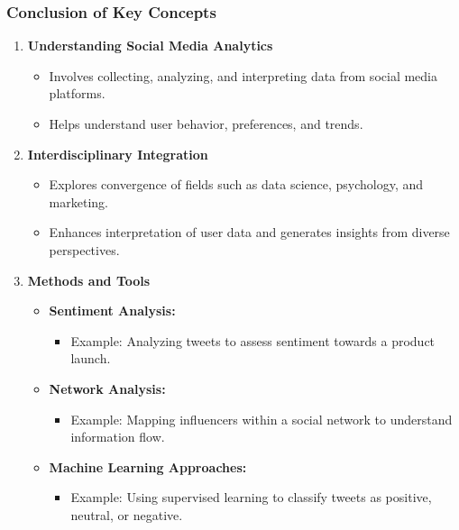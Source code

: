\documentclass{beamer}
\begin{document}
\begin{frame}[fragile]
    \frametitle{Conclusion of Key Concepts}
    
    \begin{enumerate}
        \item \textbf{Understanding Social Media Analytics}
        \begin{itemize}
            \item Involves collecting, analyzing, and interpreting data from social media platforms.
            \item Helps understand user behavior, preferences, and trends.
        \end{itemize}
        
        \item \textbf{Interdisciplinary Integration}
        \begin{itemize}
            \item Explores convergence of fields such as data science, psychology, and marketing.
            \item Enhances interpretation of user data and generates insights from diverse perspectives.
        \end{itemize}
        
        \item \textbf{Methods and Tools}
        \begin{itemize}
            \item \textbf{Sentiment Analysis:} 
            \begin{itemize}
                \item Example: Analyzing tweets to assess sentiment towards a product launch.
            \end{itemize}
            \item \textbf{Network Analysis:} 
            \begin{itemize}
                \item Example: Mapping influencers within a social network to understand information flow.
            \end{itemize}
            \item \textbf{Machine Learning Approaches:} 
            \begin{itemize}
                \item Example: Using supervised learning to classify tweets as positive, neutral, or negative.
            \end{itemize}
        \end{itemize}
    \end{enumerate}
\end{frame}
\end{document}
